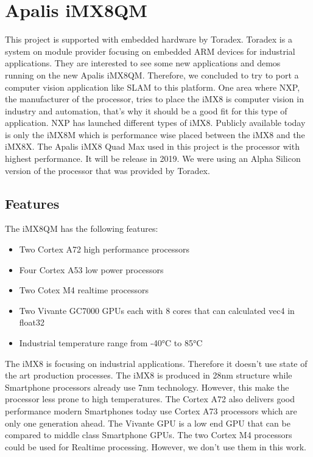 \documentclass[11pt,a4paper,titlepage,oneside]{report}
\begin{document}
\section{Apalis iMX8QM}

This project is supported with embedded hardware by Toradex. Toradex is a system on module provider focusing on embedded ARM devices for industrial applications.  They are interested to see some new applications and demos running on the new Apalis iMX8QM. Therefore, we concluded to try to port a computer vision application like SLAM to this platform. One area where NXP, the manufacturer of the processor, tries to place the iMX8 is computer vision in industry and automation, that's why it should be a good fit for this type of application. NXP has launched different types of iMX8. Publicly available today is only the iMX8M which is performance wise placed between the iMX8 and the iMX8X. The Apalis iMX8 Quad Max used in this project is the processor with highest performance. It will be release in 2019. We were using an Alpha Silicon version of the processor that was provided by Toradex.

\subsection{Features}

The iMX8QM has the following features:
\begin{itemize}
  \item Two Cortex A72 high performance processors
  \item Four Cortex A53 low power processors
  \item Two Cotex M4 realtime processors 
  \item Two Vivante GC7000 GPUs each with 8 cores that can calculated vec4 in float32
  \item Industrial temperature range from -40°C to 85°C
\end{itemize}

The iMX8 is focusing on industrial applications. Therefore it doesn't use state of the art production processes. The iMX8 is produced in 28nm structure while Smartphone processors already use 7nm technology. However, this make the processor less prone to high temperatures. The Cortex A72 also delivers good performance modern Smartphones today use Cortex A73 processors which are only one generation ahead. The Vivante GPU is a low end GPU that can be compared to middle class Smartphone GPUs. The two Cortex M4 processors could be used for Realtime processing. However, we don't use them in this work.
\end{document}
